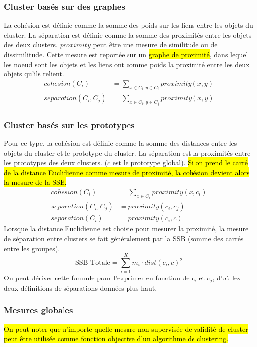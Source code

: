 \documentclass[letterpaper, 12pt]{article}
\newcommand{\alinea}{
\hspace*{0.5cm}}
\begin{document}
			\subsubsection{Cluster basés sur des graphes}
				\alinea La cohésion est définie comme la somme des poids
					sur les liens entre les objets du cluster. La 
					séparation est définie comme la somme des proximités
					entre les objets des deux clusters. $proximity$ peut
					être une mesure de similitude ou de dissimilitude. 
					Cette mesure est reportée sur un \hl{graphe de proximité},
					dans lequel les noeud sont les objets et les liens
					ont comme poids la proximité entre les deux objets  
					qu'ils relient.
					\begin{align*}
						cohesion(C_i) &= \sum_{x\in C_i, y\in C_i}
								proximity(x, y)\\
						separation(C_i, C_j) &= \sum_{x\in C_i, y\in C_j}
								proximity(x, y)
					\end{align*}
			\subsubsection{Cluster basés sur les prototypes}
				\alinea Pour ce type, la cohésion est définie comme
					la somme des distances entre les objets du cluster 
					et le prototype du cluster. La séparation est la 
					proximités entre les prototypes des deux clusters.
					($c$ est le prototype global). \hl{Si on prend
					le carré de la distance Euclidienne comme mesure de 
					proximité, la cohésion devient alors la mesure de la
					SSE.}
					\begin{align*}
						cohesion(C_i) &= \sum_{x\in C_i}
								proximity(x, c_i)\\
						separation(C_i, C_j) &= proximity(c_i, c_j)\\
						separation(C_i) &= proximity(c_i, c)
					\end{align*}
					Lorsque la distance Euclidienne est choisie pour mesurer 
					la proximité, la mesure de séparation entre clusters
					se fait généralement par la SSB (somme des carrés
					entre les groupes).
					$$ \text{SSB Totale} = \sum_{i=1}^{K} m_i \cdot 
							dist(c_i, c)^2 $$
					On peut dériver cette formule pour l'exprimer en 
					fonction de $c_i$ et $c_j$, d'où les deux définitions
					de séparations données plus haut.
			\subsubsection{Mesures globales}
				\alinea \hl{On peut noter que n'importe quelle mesure 
					non-supervisée de validité de cluster peut être utilisée
					comme fonction objective d'un algorithme de clustering.}
\end{document}
